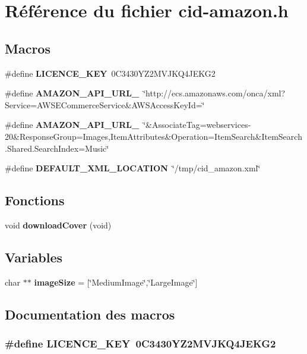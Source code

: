 \section{Référence du fichier cid-amazon.h}
\label{cid-amazon_8h}
\subsection*{Macros}
\begin{CompactItemize}
\item 
\#define {\bf LICENCE\_\-KEY}~0C3430YZ2MVJKQ4JEKG2
\item 
\#define {\bf AMAZON\_\-API\_\-URL\_}~\char`\"{}http://ecs.amazonaws.com/onca/xml?Service=AWSECommerceService\&AWSAccessKeyId=\char`\"{}
\item 
\#define {\bf AMAZON\_\-API\_\-URL\_}~\char`\"{}\&AssociateTag=webservices-20\&ResponseGroup=Images,ItemAttributes\&Operation=ItemSearch\&ItemSearch.Shared.SearchIndex=Music\char`\"{}
\item 
\#define {\bf DEFAULT\_\-XML\_\-LOCATION}~\char`\"{}/tmp/cid\_\-amazon.xml\char`\"{}
\end{CompactItemize}
\subsection*{Fonctions}
\begin{CompactItemize}
\item 
void {\bf downloadCover} (void)
\end{CompactItemize}
\subsection*{Variables}
\begin{CompactItemize}
\item 
char $\ast$$\ast$ {\bf imageSize} = [\char`\"{}MediumImage\char`\"{},\char`\"{}LargeImage\char`\"{}]
\end{CompactItemize}


\subsection{Documentation des macros}
\subsubsection{\setlength{\rightskip}{0pt plus 5cm}\#define LICENCE\_\-KEY~0C3430YZ2MVJKQ4JEKG2}\label{cid-amazon_8h_6f40ba58f2a2ede9f4dacb6554a71854}


